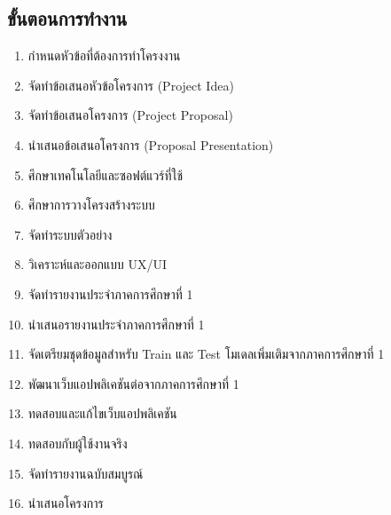 \documentclass[12pt,oneside,openright,a4paper]{cpe-thai-project}
\begin{document}
\subsection{ขั้นตอนการทํางาน} 
\begin{enumerate}
  \item กำหนดหัวข้อที่ต้องการทำโครงงาน 
  \item จัดทำข้อเสนอหัวข้อโครงการ (Project Idea)
  \item จัดทำข้อเสนอโครงการ (Project Proposal)
  \item นำเสนอข้อเสนอโครงการ (Proposal Presentation)
  \item ศึกษาเทคโนโลยีและซอฟต์แวร์ที่ใช้
 \item ศึกษาการวางโครงสร้างระบบ
 \item จัดทำระบบตัวอย่าง
 \item วิเคราะห์และออกแบบ UX/UI
 \item จัดทำรายงานประจำภาคการศึกษาที่ 1
 \item นำเสนอรายงานประจำภาคการศึกษาที่ 1
 \item จัดเตรียมชุดข้อมูลสำหรับ Train และ Test โมเดลเพิ่มเติมจากภาคการศึกษาที่ 1
 \item พัฒนาเว็บแอปพลิเคชันต่อจากภาคการศึกษาที่ 1
 \item ทดสอบและแก้ไขเว็บแอปพลิเคชัน
 \item ทดสอบกับผู้ใช้งานจริง
 \item จัดทำรายงานฉบับสมบูรณ์
 \item นำเสนอโครงการ
\end{enumerate}
\end{document}
